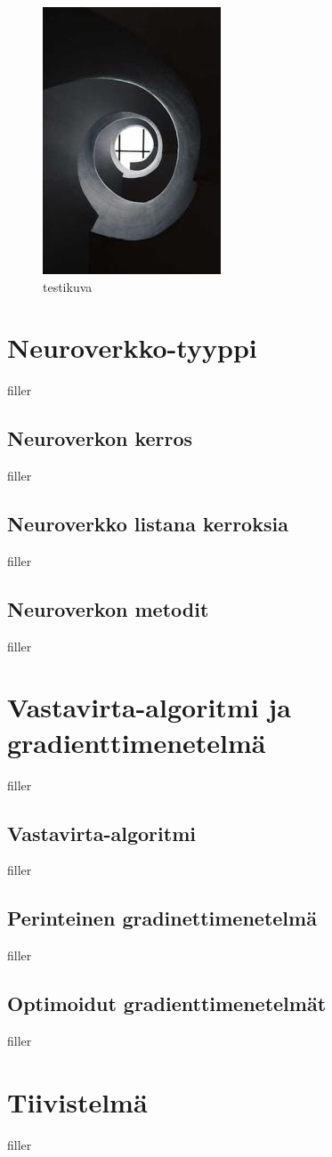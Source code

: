 \documentclass{article}
\begin{document}
\begin{figure}
    \centering
    \includegraphics{testimage.jpg}
    \caption{testikuva}
    \label{testikuva}
\end{figure}

\section{Neuroverkko-tyyppi}

filler

\subsection{Neuroverkon kerros}

filler

\subsection{Neuroverkko listana kerroksia}

filler

\subsection{Neuroverkon metodit}

filler

\section{Vastavirta-algoritmi ja gradienttimenetelmä}

filler

\subsection{Vastavirta-algoritmi}

filler

\subsection{Perinteinen gradinettimenetelmä}

filler

\subsection{Optimoidut gradienttimenetelmät}

filler

\section{Tiivistelmä}

filler

\printbibliography
\end{document}
